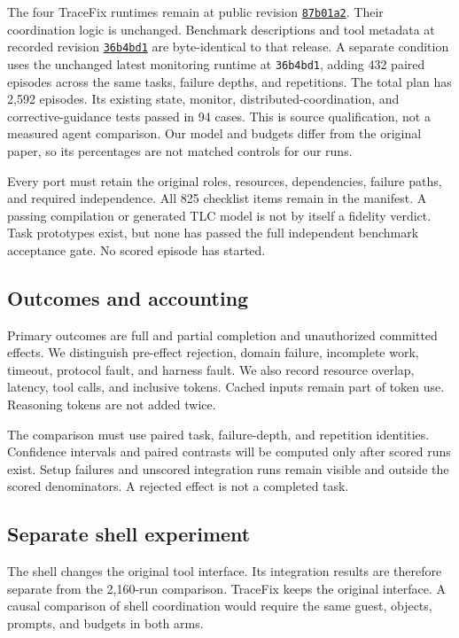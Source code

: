 \documentclass[10pt]{article}
\begin{document}
The four TraceFix runtimes remain at public revision
\href{https://github.com/Sensing-And-Reasoning/TraceFix/tree/87b01a2c0ae53c5045c9ce3d43cd0235b1831275}{\texttt{87b01a2}}. Their coordination logic is
unchanged. Benchmark descriptions and tool metadata at recorded revision
\href{https://github.com/Sensing-And-Reasoning/TraceFix/tree/36b4bd108fcd74f7efb17613aebbe3fdf55499a9}{\texttt{36b4bd1}} are byte-identical to that
release. A separate condition uses the unchanged latest monitoring runtime at
\texttt{36b4bd1}, adding 432 paired episodes across the same tasks, failure
depths, and repetitions. The total plan has 2,592 episodes. Its existing state,
monitor, distributed-coordination, and corrective-guidance tests passed in 94
cases. This is source qualification, not a measured agent comparison.
Our model and budgets differ from the original paper, so its percentages are not
matched controls for our runs.

Every port must retain the original roles, resources, dependencies, failure
paths, and required independence. All 825 checklist items remain in the
manifest. A passing compilation or generated TLC model is not by itself a
fidelity verdict. Task prototypes exist, but none has passed the
full independent benchmark acceptance gate. No scored episode has started.

\subsection{Outcomes and accounting}
Primary outcomes are full and partial completion and unauthorized committed
effects. We distinguish pre-effect rejection, domain failure, incomplete work,
timeout, protocol fault, and harness fault. We also record resource overlap,
latency, tool calls, and inclusive tokens. Cached inputs remain part of token
use. Reasoning tokens are not added twice.

The comparison must use paired task, failure-depth, and repetition identities.
Confidence intervals and paired contrasts will be computed only after scored
runs exist. Setup failures and unscored integration runs remain visible and
outside the scored denominators. A rejected effect is not a completed task.

\subsection{Separate shell experiment}
The shell changes the original tool interface. Its integration results are
therefore separate from the 2,160-run comparison. TraceFix keeps the original
interface. A causal comparison of shell coordination would require the same
guest, objects, prompts, and budgets in both arms.
\end{document}
